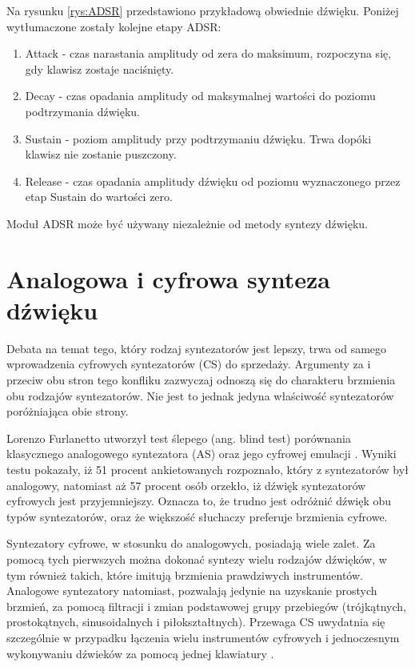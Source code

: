 Na rysunku \ref{rys:ADSR} przedstawiono przykładową obwiednie dźwięku. Poniżej wytłumaczone zostały kolejne etapy ADSR:
\begin{enumerate}
	\item Attack - czas narastania amplitudy od zera do maksimum, rozpoczyna się, gdy klawisz zostaje naciśnięty.
	
	\item Decay - czas opadania amplitudy od maksymalnej wartości do poziomu podtrzymania dźwięku.
	
	\item Sustain - poziom amplitudy przy podtrzymaniu dźwięku. Trwa dopóki klawisz nie zostanie puszczony.
	
	\item Release - czas opadania amplitudy dźwięku od poziomu wyznaczonego przez etap Sustain do wartości zero.
\end{enumerate}
Moduł ADSR może być używany niezależnie od metody syntezy dźwięku.

\section{Analogowa i cyfrowa synteza dźwięku}
Debata na temat tego, który rodzaj syntezatorów jest lepszy, trwa od samego wprowadzenia cyfrowych syntezatorów (CS) do sprzedaży. Argumenty za i przeciw obu stron tego konfliku zazwyczaj odnoszą się do charakteru brzmienia obu rodzajów syntezatorów. Nie jest to jednak jedyna właściwość syntezatorów poróżniająca obie strony.

Lorenzo Furlanetto utworzył test ślepego (ang. blind test) porównania klasycznego analogowego syntezatora (AS) oraz jego cyfrowej emulacji \cite{synthtopia}. Wyniki testu pokazały, iż 51 procent ankietowanych rozpoznało, który z syntezatorów był analogowy, natomiast aż 57 procent osób orzekło, iż dźwięk syntezatorów cyfrowych jest przyjemniejszy. Oznacza to, że trudno jest odróżnić dźwięk obu typów syntezatorów, oraz że większość słuchaczy preferuje brzmienia cyfrowe.

Syntezatory cyfrowe, w stosunku do analogowych, posiadają wiele zalet. Za pomocą tych pierwszych można dokonać syntezy wielu rodzajów dźwięków, w tym również takich, które imitują brzmienia prawdziwych instrumentów. Analogowe syntezatory natomiast, pozwalają jedynie na uzyskanie prostych brzmień, za pomocą filtracji i zmian podstawowej grupy przebiegów (trójkątnych, prostokątnych, sinusoidalnych i piłokształtnych). 
Przewaga CS uwydatnia się szczególnie w przypadku łączenia wielu instrumentów cyfrowych i jednoczesnym wykonywaniu dźwieków za pomocą jednej klawiatury \cite{andertons}.

